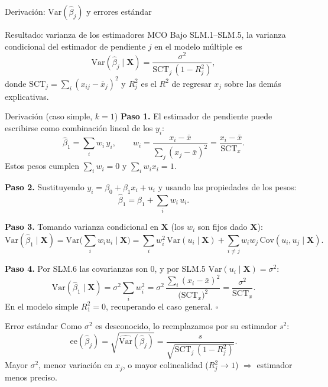 \documentclass[10pt]{beamer}
\begin{document}
\begin{frame}[allowframebreaks]{Derivación: $\text{Var}(\hat\beta_j)$ y errores estándar}

\begin{alertblock}{Resultado: varianza de los estimadores MCO}
Bajo SLM.1--SLM.5, la varianza condicional del estimador de pendiente $j$ en el modelo múltiple es
\[
\text{Var}(\hat\beta_j\mid \mathbf{X})=\frac{\sigma^2}{\text{SCT}_j\,(1-R_j^2)},
\]
donde $\text{SCT}_j=\sum_i(x_{ij}-\bar x_j)^2$ y $R_j^2$ es el $R^2$ de regresar $x_j$ sobre las demás explicativas.
\end{alertblock}

\begin{exampleblock}{Derivación (caso simple, $k=1$)}
\textbf{Paso 1.} El estimador de pendiente puede escribirse como combinación lineal de los $y_i$:
\[
\hat\beta_1=\sum_i w_i\, y_i, \qquad w_i=\frac{x_i-\bar x}{\sum_j (x_j-\bar x)^2}=\frac{x_i-\bar x}{\text{SCT}_x}.
\]
Estos pesos cumplen $\sum_i w_i=0$ y $\sum_i w_i x_i=1$.

\textbf{Paso 2.} Sustituyendo $y_i=\beta_0+\beta_1 x_i+u_i$ y usando las propiedades de los pesos:
\[
\hat\beta_1=\beta_1+\sum_i w_i\, u_i.
\]

\framebreak

\textbf{Paso 3.} Tomando varianza condicional en $\mathbf{X}$ (los $w_i$ son fijos dado $\mathbf{X}$):
\[
\text{Var}(\hat\beta_1\mid \mathbf{X})=\text{Var}\!\Big(\sum_i w_i u_i \;\Big|\;\mathbf{X}\Big)
=\sum_i w_i^2\,\text{Var}(u_i\mid\mathbf{X})+\sum_{i\neq j} w_i w_j\,\text{Cov}(u_i,u_j\mid\mathbf{X}).
\]

\textbf{Paso 4.} Por SLM.6 las covarianzas son $0$, y por SLM.5 $\text{Var}(u_i\mid\mathbf{X})=\sigma^2$:
\[
\text{Var}(\hat\beta_1\mid\mathbf{X})=\sigma^2\sum_i w_i^2
=\sigma^2\,\frac{\sum_i (x_i-\bar x)^2}{\big(\text{SCT}_x\big)^2}
=\frac{\sigma^2}{\text{SCT}_x}.
\]
En el modelo simple $R_1^2=0$, recuperando el caso general. \hfill $\square$
\end{exampleblock}

\begin{block}{Error estándar}
Como $\sigma^2$ es desconocido, lo reemplazamos por su estimador $s^2$:
\[
\text{ee}(\hat\beta_j)=\sqrt{\widehat{\text{Var}}(\hat\beta_j)}=\frac{s}{\sqrt{\text{SCT}_j\,(1-R_j^2)}}.
\]
Mayor $\sigma^2$, menor variación en $x_j$, o mayor colinealidad ($R_j^2\to1$) $\Rightarrow$ estimador menos preciso.
\end{block}

\end{frame}
\end{document}
